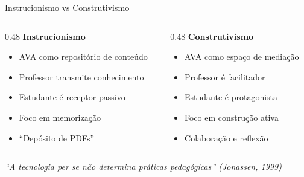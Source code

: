 \documentclass[aspectratio=169,xcolor=table]{beamer}
\begin{document}
\begin{frame}{Instrucionismo vs Construtivismo}
    \begin{columns}[T]
        \begin{column}{0.48\textwidth}
            \textbf{\textcolor{red!70}{Instrucionismo}}
            \begin{itemize}
                \item AVA como repositório de conteúdo
                \item Professor transmite conhecimento
                \item Estudante é receptor passivo
                \item Foco em memorização
                \item ``Depósito de PDFs''
            \end{itemize}
        \end{column}
        \begin{column}{0.48\textwidth}
            \textbf{\textcolor{green!70!black}{Construtivismo}}
            \begin{itemize}
                \item AVA como espaço de mediação
                \item Professor é facilitador
                \item Estudante é protagonista
                \item Foco em construção ativa
                \item Colaboração e reflexão
            \end{itemize}
        \end{column}
    \end{columns}
    \vspace{0.5cm}
    \centering
    \textit{``A tecnologia per se não determina práticas pedagógicas'' (Jonassen, 1999)}
\end{frame}
\end{document}

